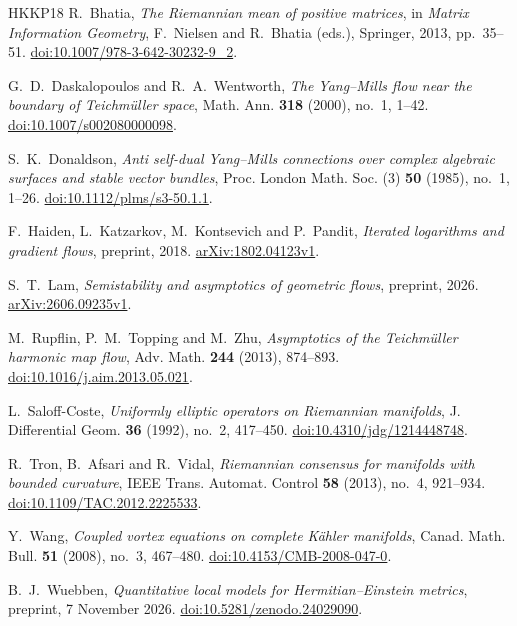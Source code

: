 \begin{thebibliography}{HKKP18}
R.~Bhatia, \emph{The Riemannian mean of positive matrices}, in
\emph{Matrix Information Geometry}, F.~Nielsen and R.~Bhatia (eds.),
Springer, 2013, pp.~35--51.
\href{https://doi.org/10.1007/978-3-642-30232-9_2}{doi:10.1007/978-3-642-30232-9\_2}.

G.~D.~Daskalopoulos and R.~A.~Wentworth,
\emph{The Yang--Mills flow near the boundary of Teichm\"uller space},
Math. Ann. \textbf{318} (2000), no.~1, 1--42.
\href{https://doi.org/10.1007/s002080000098}{doi:10.1007/s002080000098}.

S.~K.~Donaldson,
\emph{Anti self-dual Yang--Mills connections over complex algebraic surfaces and stable vector bundles},
Proc. London Math. Soc. (3) \textbf{50} (1985), no.~1, 1--26.
\href{https://doi.org/10.1112/plms/s3-50.1.1}{doi:10.1112/plms/s3-50.1.1}.

F.~Haiden, L.~Katzarkov, M.~Kontsevich and P.~Pandit,
\emph{Iterated logarithms and gradient flows}, preprint, 2018.
\href{https://arxiv.org/abs/1802.04123v1}{arXiv:1802.04123v1}.

S.~T.~Lam, \emph{Semistability and asymptotics of geometric flows},
preprint, 2026.
\href{https://arxiv.org/abs/2606.09235v1}{arXiv:2606.09235v1}.

M.~Rupflin, P.~M.~Topping and M.~Zhu,
\emph{Asymptotics of the Teichm\"uller harmonic map flow},
Adv. Math. \textbf{244} (2013), 874--893.
\href{https://doi.org/10.1016/j.aim.2013.05.021}{doi:10.1016/j.aim.2013.05.021}.

L.~Saloff-Coste, \emph{Uniformly elliptic operators on Riemannian manifolds},
J. Differential Geom. \textbf{36} (1992), no.~2, 417--450.
\href{https://doi.org/10.4310/jdg/1214448748}{doi:10.4310/jdg/1214448748}.

R.~Tron, B.~Afsari and R.~Vidal,
\emph{Riemannian consensus for manifolds with bounded curvature},
IEEE Trans. Automat. Control \textbf{58} (2013), no.~4, 921--934.
\href{https://doi.org/10.1109/TAC.2012.2225533}{doi:10.1109/TAC.2012.2225533}.

Y.~Wang, \emph{Coupled vortex equations on complete K\"ahler manifolds},
Canad. Math. Bull. \textbf{51} (2008), no.~3, 467--480.
\href{https://doi.org/10.4153/CMB-2008-047-0}{doi:10.4153/CMB-2008-047-0}.

B.~J.~Wuebben, \emph{Quantitative local models for Hermitian--Einstein metrics},
preprint, 7 November 2026.
\href{https://doi.org/10.5281/zenodo.24029090}{doi:10.5281/zenodo.24029090}.


\end{thebibliography}
